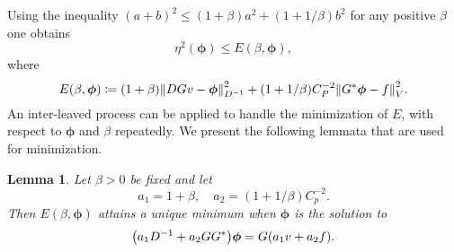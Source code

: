 \documentclass[ ]{elsarticle}
\newcommand{\Grad}{G}
\newcommand{\Div}{G^*}
\newcommand{\vsp}{V}
\newcommand{\norm}[1]{\left\lVert#1\right\rVert}
\let\originalleft\left
\let\originalright\right
\renewcommand{\left}{\mathopen{}\mathclose\bgroup\originalleft}
\renewcommand{\right}{\aftergroup\egroup\originalright}
\newtheorem{lemma}[theorem]{Lemma}
\numberwithin{equation}{section}
\begin{document}
Using the inequality $(a+b)^2\leq(1+\beta)a^2+(1+1/\beta)b^2$ for any
positive $\beta$ one obtains
\begin{equation*}
  \eta^2(\bm\phi) \leq E(\beta,\bm\phi),
\end{equation*}
where
\begin{equation*}
  E(\beta,\bm\phi) \coloneqq (1+\beta)\norm{D\Grad v-\bm\phi}_{D^{-1}}^2 +
  (1+1/\beta)C_P^{-2}\norm{\Div\bm\phi-f}^2_\vsp.
\end{equation*}
An inter-leaved process \cite{MR2817075} can be applied to handle the
minimization of $E$, with respect to $\bm\phi$ and $\beta$
repeatedly. We present the following lemmata that are used for
minimization.

\begin{lemma}\label{lemma:minimizing-phi}
  Let $\beta > 0$ be fixed and let
  \begin{equation*}
    a_1 = 1+\beta, \quad a_2 = (1+1/\beta)C_p^{-2}.
  \end{equation*}
  Then $E(\beta,\bm\phi)$ attains a unique minimum when $\bm\phi$ is
  the solution to
  \begin{equation}\label{eq:minimizing-phi}
    \left(a_1D^{-1}+a_2\Grad \Div\right)\bm\phi=\Grad (a_1v+a_2f).
  \end{equation}
\end{lemma}
\end{document}

